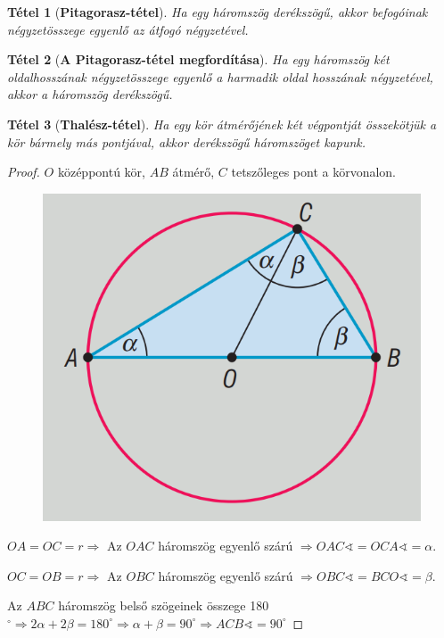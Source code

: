 \documentclass[12pt,a4paper]{article}
\newtheorem{theorem}{Tétel} [section]
\begin{document}
\begin{theorem}[\textbf{Pitagorasz-tétel}]
Ha egy háromszög derékszögű, akkor befogóinak négyzetösszege egyenlő az átfogó négyzetével.
\end{theorem}
\begin{theorem}[\textbf{A Pitagorasz-tétel megfordítása}]
Ha egy háromszög két oldalhosszának négyzetösszege egyenlő a harmadik oldal hosszának négyzetével, akkor a háromszög derékszögű.
\end{theorem}
\begin{theorem}[\textbf{Thalész-tétel}]
Ha egy kör átmérőjének két végpontját összekötjük a kör bármely más pontjával, akkor derékszögű háromszöget kapunk.
\end{theorem}
\begin{proof}
$O$ középpontú kör, $AB$ átmérő, $C$ tetszőleges pont a körvonalon.
\begin{figure}[h]
\centering
\includegraphics[scale=0.3]{geometry/thales}
\end{figure}

$OA = OC = r \Rightarrow$ Az $OAC$ háromszög egyenlő szárú $\Rightarrow OAC\sphericalangle = OCA\sphericalangle = \alpha$.

$OC = OB = r \Rightarrow$ Az $OBC$ háromszög egyenlő szárú $\Rightarrow OBC\sphericalangle = BCO\sphericalangle = \beta$.

Az $ABC$ háromszög belső szögeinek összege 180$^\circ \Rightarrow 2\alpha+2\beta=180^\circ \Rightarrow \alpha+\beta = 90^\circ \Rightarrow ACB\sphericalangle = 90^\circ$
\end{proof}
\end{document}
